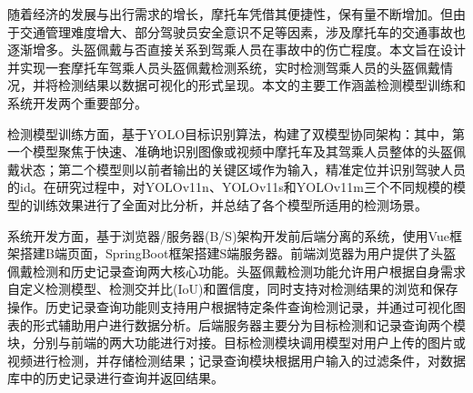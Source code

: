 随着经济的发展与出行需求的增长，摩托车凭借其便捷性，保有量不断增加。但由于交通管理难度增大、部分驾驶员安全意识不足等因素，涉及摩托车的交通事故也逐渐增多。头盔佩戴与否直接关系到驾乘人员在事故中的伤亡程度。本文旨在设计并实现一套摩托车驾乘人员头盔佩戴检测系统，实时检测驾乘人员的头盔佩戴情况，并将检测结果以数据可视化的形式呈现。本文的主要工作涵盖检测模型训练和系统开发两个重要部分。

检测模型训练方面，基于YOLO目标识别算法，构建了双模型协同架构：其中，第一个模型聚焦于快速、准确地识别图像或视频中摩托车及其驾乘人员整体的头盔佩戴状态；第二个模型则以前者输出的关键区域作为输入，精准定位并识别驾驶人员的id。在研究过程中，对YOLOv11n、YOLOv11s和YOLOv11m三个不同规模的模型的训练效果进行了全面对比分析，并总结了各个模型所适用的检测场景。

系统开发方面，基于浏览器/服务器(B/S)架构开发前后端分离的系统，使用Vue框架搭建B端页面，SpringBoot框架搭建S端服务器。前端浏览器为用户提供了头盔佩戴检测和历史记录查询两大核心功能。头盔佩戴检测功能允许用户根据自身需求自定义检测模型、检测交并比(IoU)和置信度，同时支持对检测结果的浏览和保存操作。历史记录查询功能则支持用户根据特定条件查询检测记录，并通过可视化图表的形式辅助用户进行数据分析。后端服务器主要分为目标检测和记录查询两个模块，分别与前端的两大功能进行对接。目标检测模块调用模型对用户上传的图片或视频进行检测，并存储检测结果；记录查询模块根据用户输入的过滤条件，对数据库中的历史记录进行查询并返回结果。